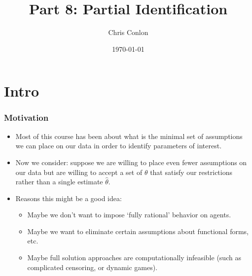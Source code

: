 \documentclass[xcolor=pdftex,dvipsnames,table,mathserif]{beamer}
\begin{document}
\title{Part 8: Partial Identification}
\author{Chris Conlon}
\date{\today}

\frame{\titlepage}

\section{Intro}

\begin{frame}
\frametitle{Motivation}
\begin{itemize}
\item Most of this course has been about what is the minimal set of assumptions we can place on our data in order to identify parameters of interest.
\item Now we consider: suppose we are willing to place even fewer assumptions on our data but are willing to accept a set of $\theta$ that satisfy our restrictions rather than a single estimate $\hat{\theta}$.
\item Reasons this might be a good idea:
\begin{itemize}
\item Maybe we don't want to impose `fully rational' behavior on agents.
\item Maybe we want to eliminate certain assumptions about functional forms, etc.
\item Maybe full solution approaches are computationally infeasible (such as complicated censoring, or dynamic games).
\end{itemize}
\end{itemize}
\end{frame}
\end{document}
